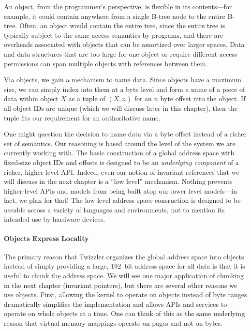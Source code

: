 
An object, from the programmer's perspective, is flexible in its
contents---for example, it could contain anywhere from a single B-tree node to the entire B-tree.
Often, an object would contain the entire tree, since the entire tree is typically subject to
the same access semantics by programs, and there are overheads associated with objects that can be
amortized over larger spaces. Data and data structures that are too large for one object or require
different access permissions can span multiple objects with references between them.

Via objects, we gain a mechanism to name data. Since objects have a maximum size, we can simply index into them at a
byte level and form a name of a piece of data within object $X$ as a tuple of $(X, n)$ for an $n$ byte offset into the
object. If all object IDs are unique (which we will discuss later in this chapter), then the tuple fits our requirement
for an authoritative name.

One might question the decision to name data via a byte offset instead of a richer set of semantics. Our reasoning is
based around the level of the system we are currently working with. The basic construction of a global address space
with fixed-size object IDs and offsets is designed to be an \emph{underlying component} of a richer, higher level API.
Indeed, even our notion of invariant references that we will discuss in the next chapter is a ``low level'' mechanism.
Nothing prevents higher-level APIs and models from being built atop our lower level models---in fact, we plan for that!
The low level address space consruction is designed to be useable across a variety of languages and environments, not to
mention its intended use by hardware devices.

\paragraph{Objects Express Locality}
The primary reason that Twizzler organizes the global address space into objects instead of simply providing a large,
192~bit address space for all data is that it is useful to chunk the address space. We will see one major application of
chunking in the next chapter (invariant pointers), but there are several other reasons we use objects. First, allowing
the kernel to operate on objects instead of byte ranges dramatically simplifies the implementation and allows APIs and
services to operate on whole objects at a time. One can think of this as the same underlying reason that virtual memory
mappings operate on pages and not on bytes.

